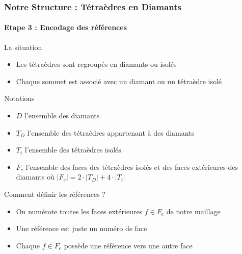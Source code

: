\documentclass[9pt]{beamer}
\begin{document}
\begin{frame}
\small
\frametitle{Notre Structure : Tétraèdres en Diamants}
\framesubtitle{Etape 3 : Encodage des références}
\small
\begin{block}{La situation}
\begin{itemize}
\item Les tétraèdres sont regroupés en diamants ou isolés
\item Chaque sommet est associé avec un diamant ou un tétraèdre isolé
\end{itemize}
\end{block}

\begin{block}{Notations}
\begin{itemize}
\item $D$ l'ensemble des diamants
\item $T_D$ l'ensemble des tétraèdres appartenant à des diamants
\item $T_i$ l'ensemble des tétraèdres isolés
\item $F_e$ l'ensemble des faces des tétraèdres isolés et des faces extérieures des diamants où $|F_e|=2\cdot |T_D|+4\cdot |T_i|$\\
\end{itemize}
\end{block}

\begin{block}{Comment définir les références ?}
\begin{itemize}
\item On numérote toutes les faces extérieures $f \in F_e$ de notre maillage
\item Une référence est juste un numéro de face
\item Chaque $f \in F_e$ possède une référence vers une autre face
\end{itemize}
\end{block}

\end{frame}
\end{document}
